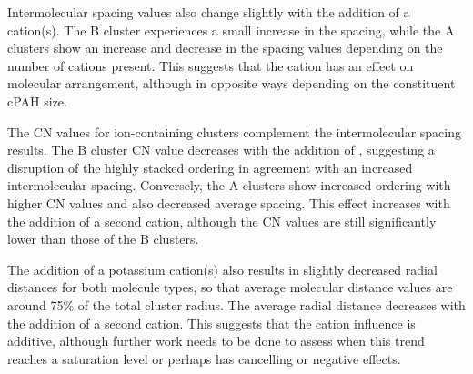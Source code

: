 Intermolecular spacing values also change slightly with the addition of a cation(s). The B cluster experiences a small increase in the spacing, while the A clusters show an increase and decrease in the spacing values depending on the number of cations present. This suggests that the cation has an effect on molecular arrangement, although in opposite ways depending on the constituent cPAH size. %

The CN values for ion-containing clusters complement the intermolecular spacing results. The B cluster CN value decreases with the addition of , suggesting a disruption of the highly stacked ordering in agreement with an increased intermolecular spacing. Conversely, the A clusters show increased ordering with higher CN values and also decreased average spacing. This effect increases with the addition of a second cation, although the CN values are still significantly lower than those of the B clusters.

The addition of a potassium cation(s) also results in slightly %
decreased radial distances for both molecule types, so that average molecular distance values are around 75\% of the total cluster radius. The average radial distance decreases with the addition of a second cation. %
This suggests that the cation influence is additive, although further work needs to be done to assess when this trend reaches a saturation level or perhaps has cancelling or negative effects. 


